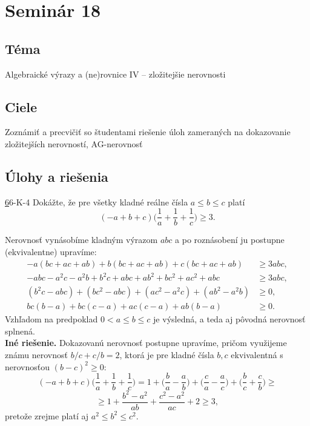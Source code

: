 
\newpage

\section*{Seminár 18}
\subsection*{Téma}
Algebraické výrazy a (ne)rovnice IV -- zložitejšie nerovnosti
\subsection*{Ciele}
Zoznámiť a precvičiť so študentami riešenie úloh zameraných na dokazovanie zložitejších nerovností, AG-nerovnosť
\subsection*{Úlohy a riešenia}
\begin{tcolorbox}[breakable,notitle,boxrule=0pt,colback=light-gray,colframe=light-gray]\ul 66-K-4 Dokážte, že pre všetky kladné reálne čísla $a \leq b \leq c$ platí $$(-a + b + c)\bigg( \frac{1}{a}+\frac{1}{b}+\frac{1}{c}\bigg) \geq 3.$$

\end{tcolorbox}

 \rieh  Nerovnosť vynásobíme kladným výrazom $abc$ a po roznásobení ju postupne (ekvivalentne) upravíme:
\begin{align*}
-a(bc + ac + ab) + b(bc + ac + ab) + c(bc + ac + ab) &\geq 3abc,\\
-abc - a^2c - a^2b + b^2c + abc + ab^2+ bc^2+ ac^2+ abc &\geq 3abc,\\
(b^2c - abc) + (bc^2 - abc) + (ac^2 - a^2c) + (ab^2 - a^2b) &\geq 0,\\
bc(b - a) + bc(c - a) + ac(c - a) + ab(b - a) &\geq 0.
\end{align*}
Vzhľadom na predpoklad $0 < a \leq b \leq c$ je výsledná, a teda aj pôvodná nerovnosť splnená.\\

\textbf{Iné riešenie.} Dokazovanú nerovnosť postupne upravíme, pričom využijeme známu nerovnosť $b/c + c/b = 2$, ktorá je pre kladné čísla $b, c$ ekvivalentná s nerovnosťou $(b - c)^2\geq 0$: $$(-a + b + c)\bigg( \frac{1}{a}+\frac{1}{b}+\frac{1}{c}\bigg) = 1+\bigg(\frac{b}{a}-\frac{a}{b}\bigg)+\bigg(\frac{c}{a}-\frac{a}{c}\bigg)+\bigg(\frac{b}{c}+\frac{c}{b}\bigg)\geq$$ $$
\geq 1+\frac{b^2-a^2}{ab}+\frac{c^2-a^2}{ac}+2\geq3,$$
pretože zrejme platí aj $a^2\leq b^2\leq c^2$.\\

